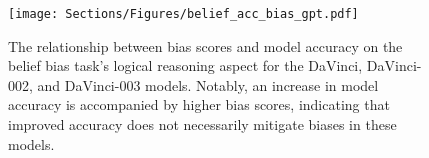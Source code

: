 \begin{figure}[t!] 
\centering
\texttt{[image: Sections/Figures/belief\_acc\_bias\_gpt.pdf]}
\caption{The relationship between bias scores and model accuracy on the belief bias task's logical reasoning aspect for the DaVinci, DaVinci-002, and DaVinci-003 models. Notably, an increase in model accuracy is accompanied by higher bias scores, indicating that improved accuracy does not necessarily mitigate biases in these models.}
\label{fig:belief_acc_bias_gpt}
\end{figure}

